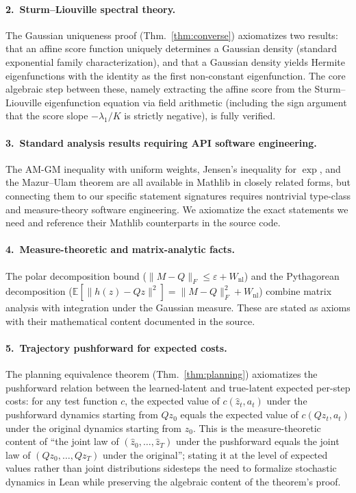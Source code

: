 \paragraph{2.\ Sturm--Liouville spectral theory.}
The Gaussian uniqueness proof (Thm.~\ref{thm:converse}) axiomatizes two results: that an affine score function uniquely determines a Gaussian density (standard exponential family characterization), and that a Gaussian density yields Hermite eigenfunctions with the identity as the first non-constant eigenfunction. The core algebraic step between these, namely extracting the affine score from the Sturm--Liouville eigenfunction equation via field arithmetic (including the sign argument that the score slope $-\lambda_1/K$ is strictly negative), is fully verified.

\paragraph{3.\ Standard analysis results requiring API software engineering.}
The AM-GM inequality with uniform weights, Jensen's inequality for $\exp$, and the Mazur--Ulam theorem are all available in Mathlib in closely related forms, but connecting them to our specific statement signatures requires nontrivial type-class and measure-theory software engineering. We axiomatize the exact statements we need and reference their Mathlib counterparts in the source code.

\paragraph{4.\ Measure-theoretic and matrix-analytic facts.}
The polar decomposition bound ($\|M - Q\|_F \leq \varepsilon + W_{\mathrm{nl}}$) and the Pythagorean decomposition ($\mathbb{E}[\|h(z) - Qz\|^2] = \|M - Q\|_F^2 + W_{\mathrm{nl}}$) combine matrix analysis with integration under the Gaussian measure. These are stated as axioms with their mathematical content documented in the source.

\paragraph{5.\ Trajectory pushforward for expected costs.}
The planning equivalence theorem (Thm.~\ref{thm:planning}) axiomatizes the pushforward relation between the learned-latent and true-latent expected per-step costs: for any test function $c$, the expected value of $c(\hat z_t, a_t)$ under the pushforward dynamics starting from $Q z_0$ equals the expected value of $c(Q z_t, a_t)$ under the original dynamics starting from $z_0$. This is the measure-theoretic content of ``the joint law of $(\hat z_0, \ldots, \hat z_T)$ under the pushforward equals the joint law of $(Q z_0, \ldots, Q z_T)$ under the original''; stating it at the level of expected values rather than joint distributions sidesteps the need to formalize stochastic dynamics in Lean while preserving the algebraic content of the theorem's proof.

